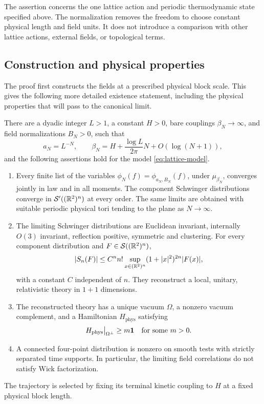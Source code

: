 The assertion concerns the one lattice action and periodic thermodynamic
state specified above.  The normalization removes the freedom to choose
constant physical length and field units.  It does not introduce a
comparison with other lattice actions, external fields, or topological
terms.

\subsection{Construction and physical properties}

The proof first constructs the fields at a prescribed physical block
scale.  This gives the following more detailed existence statement,
including the physical properties that will pass to the canonical limit.

\begin{theorem}\label{thm:main}
There are a dyadic integer $L>1$, a constant $H>0$, bare couplings
$\beta_N\to\infty$, and field normalizations $B_N>0$, such that
\begin{equation}\label{eq:main-prescription}
 a_N=L^{-N},\qquad
 \beta_N=H+\frac{\log L}{2\pi}N+O(\log(N+1)),
\end{equation}
and the following assertions hold for the model
\eqref{eq:lattice-model}.
\begin{enumerate}[label=\textup{(\roman*)}]
\item Every finite list of the variables
$\phi_N(f)=\phi_{a_N,B_N}(f)$, under $\mu_{\beta_N}$, converges jointly
in law and in all moments. The component Schwinger distributions converge
in $\mathcal S'((\mathbb R^2)^n)$ at every order. The same limits are obtained
with suitable periodic physical tori tending to the plane as $N\to\infty$.
\item The limiting Schwinger distributions are Euclidean invariant,
internally $O(3)$ invariant, reflection positive, symmetric and clustering.
For every component distribution and $F\in\mathcal S((\mathbb R^2)^n)$,
\[
 |S_n(F)|\le C^n n!\sup_{x\in(\mathbb R^2)^n}
       (1+|x|^2)^{2n}|F(x)|,
\]
with a constant $C$ independent of $n$. They reconstruct a local, unitary,
relativistic theory in $1+1$ dimensions.
\item The reconstructed theory has a unique vacuum $\Omega$, a nonzero
vacuum complement, and a Hamiltonian $H_{\mathrm{phys}}$ satisfying
\[
 H_{\mathrm{phys}}\big|_{\Omega^\perp}\ge m\mathbf 1
 \quad\text{for some }m>0.
\]
\item A connected four-point distribution is nonzero on smooth tests
with strictly separated time supports. In particular, the limiting
field correlations do not satisfy Wick factorization.
\end{enumerate}
The trajectory is selected by fixing its terminal kinetic coupling to
$H$ at a fixed physical block length.
\end{theorem}

